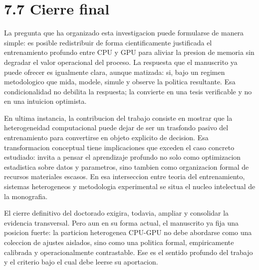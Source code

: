 \section{7.7 Cierre final}
La pregunta que ha organizado esta investigacion puede formularse de manera simple: es posible redistribuir de forma cientificamente justificada el entrenamiento profundo entre CPU y GPU para aliviar la presion de memoria sin degradar el valor operacional del proceso. La respuesta que el manuscrito ya puede ofrecer es igualmente clara, aunque matizada: si, bajo un regimen metodologico que mida, modele, simule y observe la politica resultante. Esa condicionalidad no debilita la respuesta; la convierte en una tesis verificable y no en una intuicion optimista.

En ultima instancia, la contribucion del trabajo consiste en mostrar que la heterogeneidad computacional puede dejar de ser un trasfondo pasivo del entrenamiento para convertirse en objeto explicito de decision. Esa transformacion conceptual tiene implicaciones que exceden el caso concreto estudiado: invita a pensar el aprendizaje profundo no solo como optimizacion estadistica sobre datos y parametros, sino tambien como organizacion formal de recursos materiales escasos. En esa interseccion entre teoria del entrenamiento, sistemas heterogeneos y metodologia experimental se situa el nucleo intelectual de la monografia.

El cierre definitivo del doctorado exigira, todavia, ampliar y consolidar la evidencia transversal. Pero aun en su forma actual, el manuscrito ya fija una posicion fuerte: la particion heterogenea CPU-GPU no debe abordarse como una coleccion de ajustes aislados, sino como una politica formal, empiricamente calibrada y operacionalmente contrastable. Ese es el sentido profundo del trabajo y el criterio bajo el cual debe leerse su aportacion.
